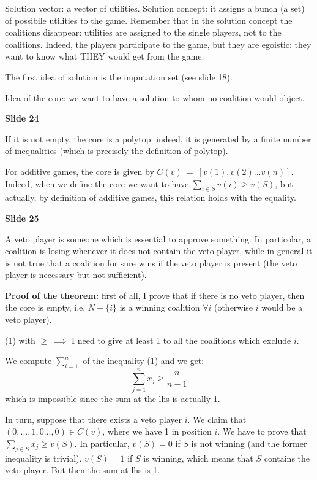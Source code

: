 \noindent Solution vector: a vector of utilities. Solution concept: it assigns 
a bunch (a set) of possibile utilities to the game. Remember that in the 
solution concept the coalitions disappear: utilities are assigned to the single 
players, not to the coalitions. Indeed, the players participate to the game, 
but they are egoistic: they want to know what THEY would get from the game.

\noindent The first idea of solution is the imputation set (see slide 18).


\noindent Idea of the core: we want to have a solution to whom no coalition 
would object.

\bigskip
\noindent \textbf{Slide 24}

\noindent If it is not empty, the core is a polytop: indeed, it is generated by 
a finite number of inequalities (which is precisely the definition of polytop).

\noindent For additive games, the core is given by $C(v)~=~[v(1),v(2)...v(n)]$. 
Indeed, when we define the core we want to have 
$\sum_{i \in S}{v(i)} \geq v(S)$, but actually, by definition of additive 
games, this relation holds with the equality.

\bigskip
\noindent \textbf{Slide 25}

\noindent A veto player is someone which is essential to approve something. In 
particolar, a coalition is losing whenever it does not contain the veto player, 
while in general it is not true that a coalition for sure wins if the veto 
player is present (the veto player is necessary but not sufficient).

\noindent \textbf{Proof of the theorem:} first of all, I prove that if there is 
no veto player, then the core is empty, i.e. $N-\{i\}$ is a winning coalition 
$\forall i$ (otherwise $i$ would be a veto player).

\noindent (1) with $\geq~\implies$ I need to give at least 1 to all the 
coalitions which exclude $i$.

\noindent We compute $\sum_{i=1}^n$ of the inequality (1) and we get:
\[
	\sum_{j=1}^n{x_j} \geq \frac{n}{n-1}
\]
which is impossible since the sum at the lhs is actually 1.

\noindent In turn, suppose that there exists a veto player $i$. We claim that 
$(0,...,1,0...,0) \in C(v)$, where we have 1 in position $i$. We have to prove 
that $\sum_{j \in S}{x_j} \geq v(S)$. In particular, $v(S)=0$ if $S$ is not 
winning (and the former inequality is trivial). $v(S)=1$ if $S$ is winning, 
which means that $S$ contains the veto player. But then the sum at lhs is 1.

